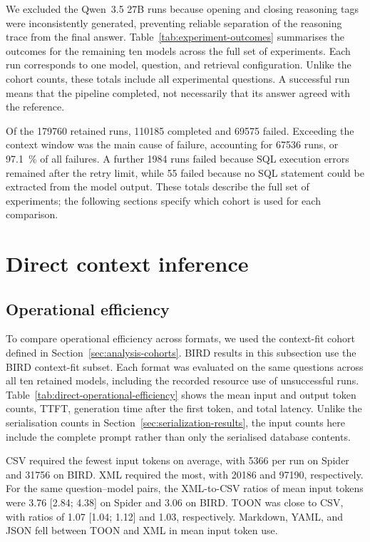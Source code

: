 

We excluded the Qwen~3.5 27B runs because opening and closing reasoning tags were inconsistently generated,
preventing reliable separation of the reasoning trace from the final answer.
Table~\ref{tab:experiment-outcomes} summarises the outcomes for the remaining ten models across the full set
of experiments. Each run corresponds to one model, question, and retrieval configuration. Unlike the cohort
counts, these totals include all experimental questions. A successful run means that the pipeline completed,
not necessarily that its answer agreed with the reference.

Of the \num{179760} retained runs, \num{110185} completed and \num{69575} failed. Exceeding the context
window was the main cause of failure, accounting for \num{67536} runs, or \qty{97.1}{\percent} of all
failures. A further \num{1984} runs failed because SQL execution errors remained after the retry limit, while
\num{55} failed because no SQL statement could be extracted from the model output. These totals describe the
full set of experiments; the following sections specify which cohort is used for each comparison.

\section{Direct context inference} \label{sec:direct-results}

\subsection{Operational efficiency}



To compare operational efficiency across formats, we used the context-fit cohort defined in
Section~\ref{sec:analysis-cohorts}. BIRD results in this subsection use the BIRD context-fit subset. Each
format was evaluated on the same questions across all ten retained models, including the recorded resource
use of unsuccessful runs.
Table~\ref{tab:direct-operational-efficiency} shows the mean input and output token counts, TTFT, generation
time after the first token, and total latency. Unlike the serialisation counts in
Section~\ref{sec:serialization-results}, the input counts here include the complete prompt rather than only
the serialised database contents.

CSV required the fewest input tokens on average, with \num{5366} per run on Spider and \num{31756} on BIRD.
XML required the most, with \num{20186} and \num{97190}, respectively. For the same question--model pairs,
the XML-to-CSV ratios of mean input tokens were \num{3.76} [\num{2.84}; \num{4.38}] on Spider and \num{3.06}
on BIRD. TOON was close to CSV, with ratios of \num{1.07} [\num{1.04}; \num{1.12}] and
\num{1.03}, respectively. Markdown, YAML, and JSON fell between TOON and XML in mean input token use.


